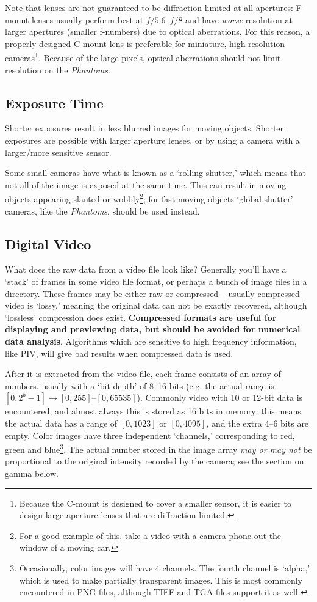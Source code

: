 \documentclass[11pt]{amsart}
\begin{document}
Note that lenses are not guaranteed to be diffraction limited at all apertures: F-mount lenses usually perform best at $f/5.6$--$f/8$ and have \emph{worse} resolution at larger apertures (smaller f-numbers) due to optical aberrations.
For this reason, a properly designed C-mount lens is preferable for miniature, high resolution cameras\footnote{Because the C-mount is designed to cover a smaller sensor, it is easier to design large aperture lenses that are diffraction limited.}.
Because of the large pixels, optical aberrations should not limit resolution on the \emph{Phantoms}.

\subsection{Exposure Time}
Shorter exposures result in less blurred images for moving objects.  
Shorter exposures are possible with larger aperture lenses, or by using a camera with a larger/more sensitive sensor.

Some small cameras have what is known as a `rolling-shutter,' which means that not all of the image is exposed at the same time.
This can result in moving objects appearing slanted or wobbly\footnote{For a good example of this, take a video with a camera phone out the window of a moving car.}; for fast moving objects `global-shutter' cameras, like the \emph{Phantoms}, should be used instead.

\subsection{Digital Video}
What does the raw data from a video file look like?
Generally you'll have a `stack' of frames in some video file format, or perhaps a bunch of image files in a directory.
These frames may be either raw or compressed -- usually compressed video is `lossy,' meaning the original data can not be exactly recovered, although `lossless' compression does exist.
{\bf Compressed formats are useful for displaying and previewing data, but should be avoided for numerical data analysis}.
Algorithms which are sensitive to high frequency information, like PIV, will give bad results when compressed data is used.

After it is extracted from the video file, each frame consists of an array of numbers, usually with a `bit-depth' of 8--16 bits (e.g. the actual range is $[0, 2^b-1] \rightarrow[0, 255]$--$[0, 65535]$).
Commonly video with 10 or 12-bit data is encountered, and almost always this is stored as 16 bits in memory: this means the actual data has a range of $[0,1023]$ or $[0,4095]$, and the extra 4--6 bits are empty.
Color images have three independent `channels,' corresponding to red, green and blue\footnote{Occasionally, color images will have 4 channels.  The fourth channel is `alpha,' which is used to make partially transparent images.  This is most commonly encountered in PNG files, although TIFF and TGA files support it as well.}.
The actual number stored in the image array \emph{may or may not} be proportional to the original intensity recorded by the camera; see the section on gamma below.
\end{document}

